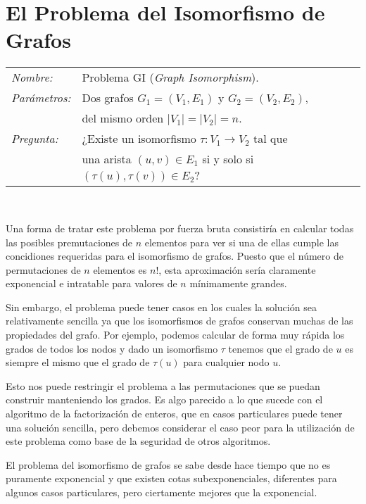 \section{El Problema del Isomorfismo de Grafos}

\hfil

\begin{tabular}{|ll}\label{problemaGI}
	\textit{Nombre:} & Problema GI ({\em Graph Isomorphism}). \\
	\textit{Parámetros:} & Dos grafos $G_1 = (V_1, E_1)$ y $G_2 = (V_2, E_2)$,
	\\ & del mismo orden $\mid V_1 \mid = \mid V_2 \mid = n$. \\
	\textit{Pregunta:} & ¿Existe un isomorfismo $\tau : V_1 \rightarrow V_2$
	tal que \\ & una arista $(u,v)\in E_1$ si y solo si $(\tau (u),\tau (v))
	\in E_2$? \\
\end{tabular}
\\

\hfil

Una forma de tratar este problema por fuerza bruta consistir\'ia en calcular
todas las posibles premutaciones de $n$ elementos para ver si una de ellas
cumple las concidiones requeridas para el isomorfismo de grafos. Puesto que el
n\'umero de permutaciones de $n$ elementos es $n!$, esta aproximaci\'on ser\'ia
claramente exponencial e intratable para valores de $n$ m\'inimamente grandes.

Sin embargo, el problema puede tener casos en los cuales la soluci\'on sea
relativamente sencilla ya que los isomorfismos de grafos conservan muchas de las
propiedades del grafo. Por ejemplo, podemos calcular de forma muy r\'apida los
grados de todos los nodos y dado un isomorfismo $\tau$ tenemos que el grado de
$u$ es siempre el mismo que el grado de $\tau(u)$ para cualquier nodo $u$.

Esto nos puede restringir el problema a las permutaciones que se puedan construir
manteniendo los grados. Es algo parecido a lo que sucede con el algoritmo de la factorizaci\'on de enteros,
que en casos particulares puede tener una soluci\'on sencilla, pero debemos considerar
el caso peor para la utilizaci\'on de este problema como base de la seguridad de otros algoritmos.

El problema del isomorfismo de grafos se sabe desde hace tiempo que no es puramente
exponencial y que existen cotas subexponenciales, diferentes para algunos casos particulares,
pero ciertamente mejores que la exponencial.

